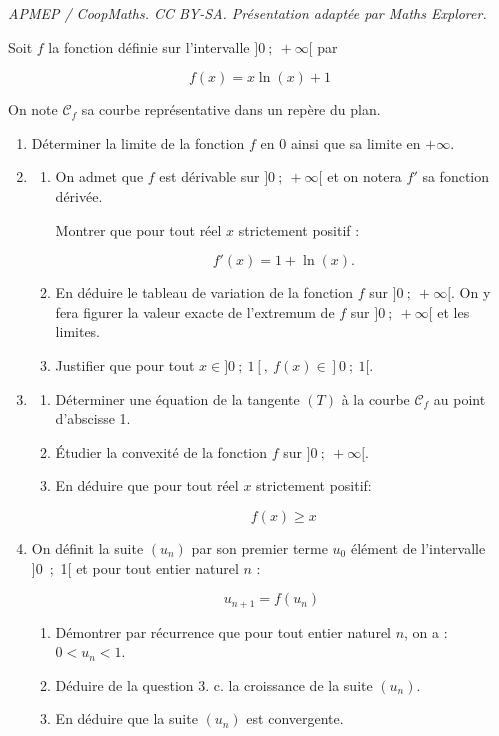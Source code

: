 \documentclass[10pt]{article}
\begin{document}
\noindent\textit{APMEP / CoopMaths. CC BY-SA. Présentation adaptée par Maths Explorer.}\par\medskip
\medskip

Soit $f$ la fonction définie sur l'intervalle $]0~;~ +\infty[$ par 

\[f(x) = x\ln (x) + 1\]

On note $\mathcal{C}_f$ sa courbe représentative dans un repère du plan.

\medskip

\begin{enumerate}
\item Déterminer la limite de la fonction $f$ en $0$ ainsi que sa limite en $+\infty$.
\item 
	\begin{enumerate}
		\item On admet que $f$ est dérivable sur $]0~;~+\infty[$ et on notera $f'$ sa fonction dérivée.
		
Montrer que pour tout réel $x$ strictement positif : 

\[f'(x) = 1 + \ln (x).\]

		\item En déduire le tableau de variation de la fonction $f$ sur $]0~;~ +\infty[$. On y fera figurer la valeur exacte de l'extremum de $f$ sur $]0~;~ +\infty[$ et les limites.
		\item Justifier que pour tout $x \in  ]0~;~1[,\:f(x) \in  ]0~;~1[$.
	\end{enumerate}	
\item 
	\begin{enumerate}
		\item Déterminer une équation de la tangente $(T)$ à la courbe $\mathcal{C}_f$ au point d'abscisse 1.
		\item Étudier la convexité de la fonction $f$ sur $]0~;~+\infty[$.
		\item En déduire que pour tout réel $x$ strictement positif: 
		
		\[f(x) \geqslant x\]
		
	\end{enumerate}
\item On définit la suite $\left(u_n\right)$ par son premier terme $u_0$ élément de l'intervalle ]0~;~1[ et pour tout entier naturel $n$ :

\[u_{n+1} = f\left(u_n\right)\]

	\begin{enumerate}
		\item Démontrer par récurrence que pour tout entier naturel $n$, on a : $0 < u_n < 1$.
		\item Déduire de la question 3. c. la croissance de la suite $\left(u_n\right)$.
		\item En déduire que la suite $\left(u_n\right)$ est convergente.
	\end{enumerate}
\end{enumerate}

\bigskip
\end{document}
